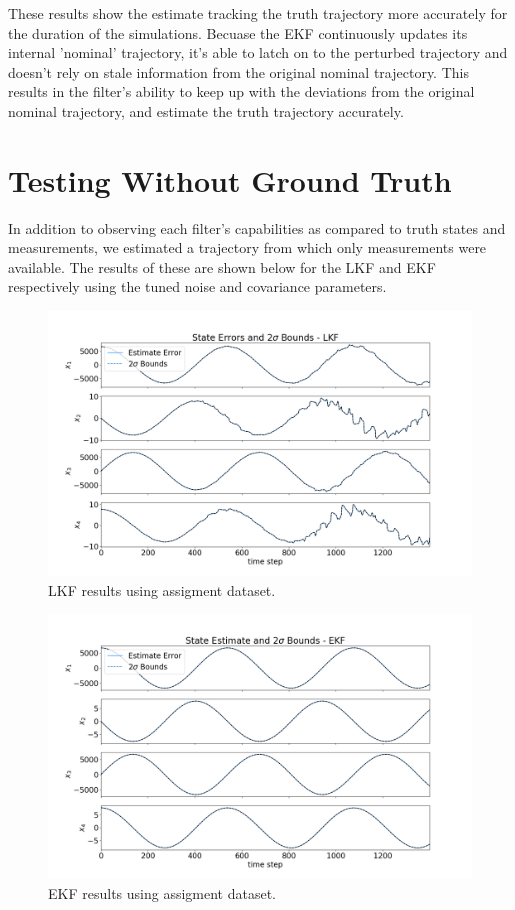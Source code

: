 \documentclass[11pt, a4paper]{article}
\begin{document}
These results show the estimate tracking the truth trajectory more accurately for the duration of the simulations. 
Becuase the EKF continuously updates its internal 'nominal' trajectory, it's able to latch on to the perturbed trajectory and doesn't rely on stale information from the original nominal trajectory. 
This results in the filter's ability to keep up with the deviations from the original nominal trajectory, and estimate the truth trajectory accurately.


\section{Testing Without Ground Truth}
In addition to observing each filter's capabilities as compared to truth states and measurements, we estimated a trajectory from which only measurements were available. 
The results of these  are shown below for the LKF and EKF respectively using the tuned noise and covariance parameters. 
\begin{figure}[H]
	\centering
	\includegraphics[width=\textwidth]{Figures/lkf_dataste_est.png}
	\caption{LKF results using assigment dataset.}
	\label{fig:lkf_dataset}
\end{figure}

\begin{figure}[H]
	\centering
	\includegraphics[width=\textwidth]{Figures/ekf_dataset_est.png}
	\caption{EKF results using assigment dataset.}
	\label{fig:ekf_dataset}
\end{figure}
\end{document}
